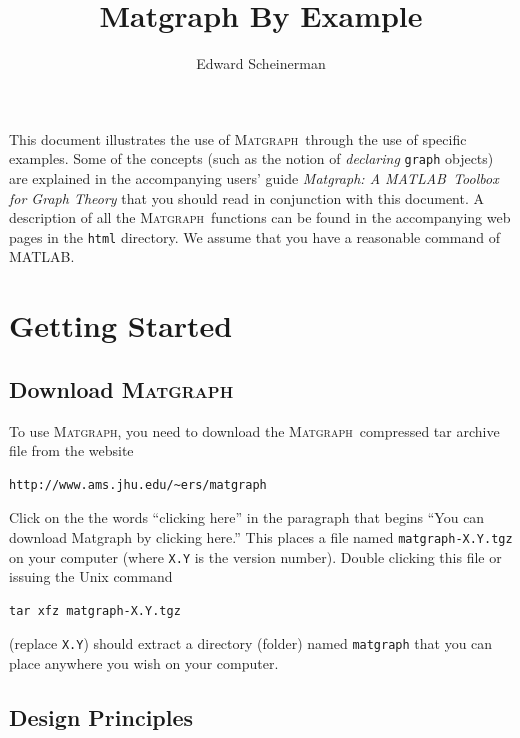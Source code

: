 \documentclass[12pt]{amsart}
\title{Matgraph By Example}
\author{Edward Scheinerman}
\date{\superdate}
\newcommand\matlab{MATLAB}
\newcommand\matgraph{\textsc{Matgraph}}
\begin{document}
\maketitle


This document illustrates the use of \matgraph\ through the use of
specific examples. Some of the concepts (such as the notion of
\emph{declaring} \verb|graph| objects) are explained in the
accompanying users' guide \emph{Matgraph: A \matlab\ Toolbox for Graph
  Theory} that you should read in conjunction with this document. A
description of all the \matgraph\ functions can be found in the
accompanying web pages in the \verb|html| directory.  We assume that
you have a reasonable command of \matlab.

\section{Getting Started}


\subsection{Download \matgraph}
\label{sect:download}
To use \matgraph, you need to download the \matgraph\ compressed tar
archive file from the website
\begin{verbatim}
http://www.ams.jhu.edu/~ers/matgraph
\end{verbatim}
Click on the the words ``clicking here'' in the paragraph that begins
``You can download Matgraph by clicking here.'' This places a file
named \verb|matgraph-X.Y.tgz| on your computer (where \verb|X.Y| is
the version number). Double clicking this file or issuing the Unix
command
\begin{verbatim}
tar xfz matgraph-X.Y.tgz
\end{verbatim}
(replace \verb|X.Y|) should extract a directory (folder) named
\verb|matgraph| that you can place anywhere you wish on your computer.


\subsection{Design Principles}
\end{document}
